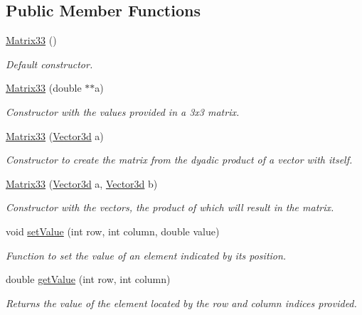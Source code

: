 \subsection*{Public Member Functions}
\begin{DoxyCompactItemize}
\item 
\hyperlink{classMatrix33_a70acb6647b172d017cc4265a29a7d263}{Matrix33} ()
\begin{DoxyCompactList}\small\item\em Default constructor. \end{DoxyCompactList}\item 
\hyperlink{classMatrix33_a4399c6da8f1ac31ce514550282c823cf}{Matrix33} (double $\ast$$\ast$a)
\begin{DoxyCompactList}\small\item\em Constructor with the values provided in a 3x3 matrix. \end{DoxyCompactList}\item 
\hyperlink{classMatrix33_a1f070a29a710043c38b56cee8214e6f7}{Matrix33} (\hyperlink{classVector3d}{Vector3d} a)
\begin{DoxyCompactList}\small\item\em Constructor to create the matrix from the dyadic product of a vector with itself. \end{DoxyCompactList}\item 
\hyperlink{classMatrix33_a7f1deae895c26e47c39c76bfaa31d3d2}{Matrix33} (\hyperlink{classVector3d}{Vector3d} a, \hyperlink{classVector3d}{Vector3d} b)
\begin{DoxyCompactList}\small\item\em Constructor with the vectors, the product of which will result in the matrix. \end{DoxyCompactList}\item 
void \hyperlink{classMatrix33_a6cdcec77fd089b2e73ad7ae85ecff30b}{set\-Value} (int row, int column, double value)
\begin{DoxyCompactList}\small\item\em Function to set the value of an element indicated by its position. \end{DoxyCompactList}\item 
double \hyperlink{classMatrix33_a849bbdf7b456ddacf7185b087fca4015}{get\-Value} (int row, int column)
\begin{DoxyCompactList}\small\item\em Returns the value of the element located by the row and column indices provided. \end{DoxyCompactList}\item 
$$
\end{DoxyCompactItemize}
